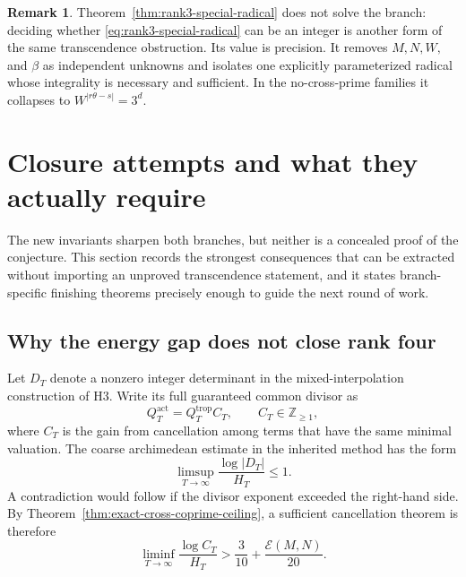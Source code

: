 \documentclass[11pt,oneside]{article}
\theoremstyle{research}
\theoremstyle{definition}
\newtheorem{remark}[theorem]{Remark}
\newcommand{\Z}{\mathbb Z}
\newcommand{\E}{\mathcal E}
\newcommand{\trop}{\mathrm{trop}}
\newcommand{\act}{\mathrm{act}}
\begin{document}
\begin{remark}
Theorem~\ref{thm:rank3-special-radical} does not solve the branch: deciding
whether \eqref{eq:rank3-special-radical} can be an integer is another form of
the same transcendence obstruction.  Its value is precision.  It removes
$M,N,W,$ and $\beta$ as independent unknowns and isolates one explicitly
parameterized radical whose integrality is necessary and sufficient.
In the no-cross-prime families it collapses to
$W^{|r\theta-s|}=3^d$.
\end{remark}

\section{Closure attempts and what they actually require}
\label{sec:closure-attempts}

The new invariants sharpen both branches, but neither is a concealed proof of
the conjecture.  This section records the strongest consequences that can be
extracted without importing an unproved transcendence statement, and it
states branch-specific finishing theorems precisely enough to guide the next
round of work.

\subsection{Why the energy gap does not close rank four}

Let $D_T$ denote a nonzero integer determinant in the mixed-interpolation
construction of H3.  Write its full guaranteed common divisor as
\begin{equation}
 Q_T^{\act}=Q_T^{\trop}C_T,
 \qquad C_T\in\Z_{\ge1},
 \label{eq:actual-divisor-cancellation}
\end{equation}
where $C_T$ is the gain from cancellation among terms that have the same
minimal valuation.  The coarse archimedean estimate in the inherited method
has the form
\begin{equation}
 \limsup_{T\to\infty}\frac{\log|D_T|}{H_T}\le1.
 \label{eq:coarse-archimedean-one}
\end{equation}
A contradiction would follow if the divisor exponent exceeded the right-hand
side.  By Theorem~\ref{thm:exact-cross-coprime-ceiling}, a sufficient
cancellation theorem is therefore
\begin{equation}
 \liminf_{T\to\infty}\frac{\log C_T}{H_T}
 >\frac3{10}+\frac{\E(M,N)}{20}.
 \label{eq:exact-cancellation-tax}
\end{equation}
\end{document}
